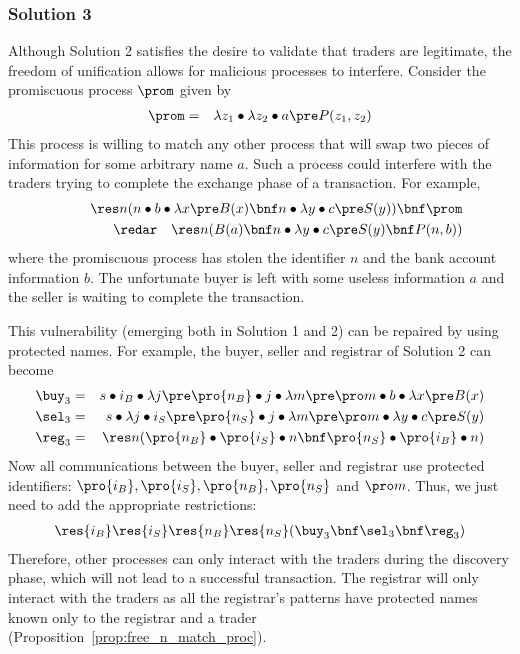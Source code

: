 \documentclass{LMCS}
\renewcommand{\rew}{\redar}
\begin{document}
\subsubsection*{Solution 3}
\label{sec:example:sol3}
Although Solution 2 satisfies the desire to validate that
traders are legitimate, the freedom of unification allows for
malicious processes to interfere. Consider the promiscuous
process $\prom$ given by
\begin{eqnarray*}
\prom &=& \lambda z_1\bullet \lambda z_2\bullet a\pre P(z_1,z_2) 
\end{eqnarray*}
This process is willing to match any other process that will swap
two pieces of information for some arbitrary name $a$. Such a
process could interfere with the traders trying to complete the
exchange phase of a transaction. For example,
\begin{eqnarray*}
\res n (n\bullet b\bullet \lambda x \pre B(x)\bnf n\bullet \lambda y\bullet c\pre S(y))\bnf\prom\\
\qquad \qquad \rew \quad \res n (B(a)\bnf n\bullet \lambda y\bullet c\pre S(y) \bnf P(n,b))
\end{eqnarray*}
where the promiscuous process has stolen the identifier $n$ and the
bank account information $b$. The unfortunate buyer is left with some
useless information $a$ and the seller is waiting to complete the
transaction.

This vulnerability (emerging both in Solution 1 and 2) can be repaired by using protected
names.
For example, the buyer, seller and registrar of Solution 2 can become 
\begin{eqnarray*}
\buy_3 &=&	s\bullet i_B\bullet\lambda j \pre \pro {n_B}\bullet j\bullet\lambda m \pre 
						\pro m\bullet b\bullet \lambda x \pre B(x) \\
\sel_3 &=& s\bullet \lambda j\bullet i_S \pre \pro {n_S}\bullet j\bullet\lambda m \pre
           \pro m\bullet \lambda y\bullet c\pre S(y) \\
\reg_3 &=& \res n (\pro {n_B}\bullet\pro{i_S}\bullet n\bnf \pro {n_S}\bullet\pro{i_B}\bullet n)
\end{eqnarray*}
Now all communications between the buyer, seller and registrar
use protected identifiers: $\pro {i_B}, \pro {i_S}, \pro {n_B},\pro {n_S}$ and $\pro m$.
Thus, we just need to add the appropriate restrictions:
\begin{eqnarray*}
\res {i_B}\res {i_S}\res {n_B} \res {n_S} (\buy_3\bnf\sel_3\bnf\reg_3)
\end{eqnarray*}
Therefore, other processes can only interact with the traders during
the discovery phase, which will not lead to a successful
transaction. The registrar will only interact with the
traders as all the registrar's patterns have protected names
known only to the registrar and a trader (Proposition~\ref{prop:free_n_match_proc}).
\end{document}
